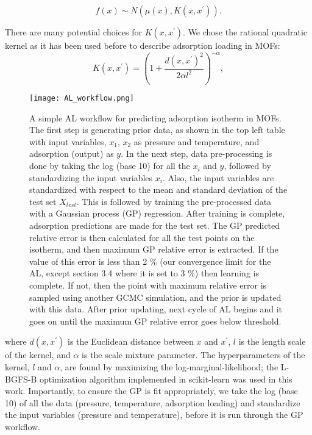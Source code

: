 \documentclass[twoside,twocolumn,9pt]{article}
\begin{document}
\begin{equation}
  f(x) \sim N(\mu(x),K(x,x^{'})).
\end{equation}

There are many potential choices for $K(x,x^{'})$. We chose the rational quadratic kernel as it has been used before to describe adsorption loading in MOFs\cite{gopalan}:
\begin{equation}
  K(x,x^{'}) = \left(1 + \frac{d(x,x^{'})^2}{2\alpha l^2}\right)^{-\alpha},
\end{equation}

\begin{figure*}
\centering
\texttt{[image: AL\_workflow.png]}
\caption{A simple AL workflow for predicting adsorption isotherm in MOFs. The first step is generating prior data, as shown in the top left table with input variables, $x_1$, $x_2$ as pressure and temperature, and adsorption (output) as $y$. In the next step, data pre-processing is done by taking the log (base 10) for all the $x_{i}$ and $y$, followed by standardizing the input variables $x_i$. Also, the input variables are standardized with respect to the mean and standard deviation of the test set $X_{test}$. This is followed by training the pre-processed data with a Gaussian process (GP) regression. After training is complete, adsorption predictions are made for the test set. The GP predicted relative error is then calculated for all the test points on the isotherm, and then maximum GP relative error is extracted. If the value of this error is less than 2 \% (our convergence limit for the AL, except section 3.4 where it is set to 3 \%) then learning is complete. If not, then the point with maximum relative error is sampled using another GCMC simulation, and the prior is updated with this data. After prior updating, next cycle of AL begins and it goes on until the maximum GP relative error goes below threshold. %
}
\label{fgr:al_workflow}
\end{figure*}

\noindent where $d(x,x^{'})$ is the Euclidean distance between $x$ and $x^{'}$, $l$ is the length scale of the kernel, and $\alpha$ is the scale mixture parameter. The hyperparameters of the kernel, $l$ and $\alpha$, are found by maximizing the log-marginal-likelihood; the L-BGFS-B optimization algorithm implemented in scikit-learn was used in this work.\cite{lbgfs,scikit-learn} Importantly, to ensure the GP is fit appropriately, we take the log (base 10) of all the data (pressure, temperature, adsorption loading) and standardize the input variables (pressure and temperature), before it is run through the GP workflow.
\end{document}
